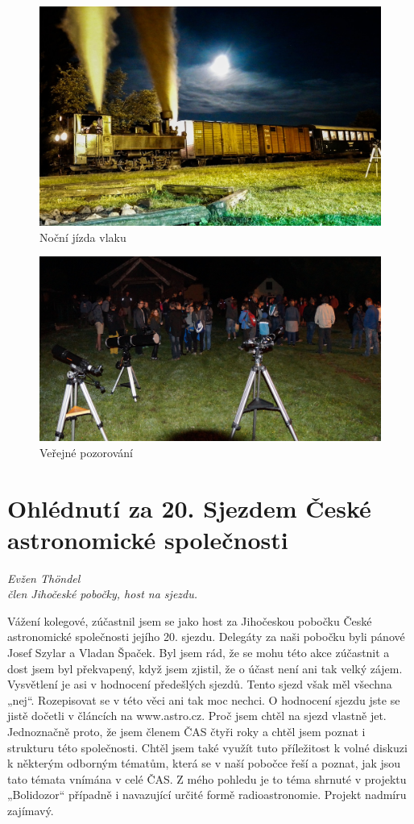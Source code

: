 \documentclass[10pt,a5paper,twoside]{book}
\newcommand{\nadpis}[2]{
\section*{#1}
	\begin{flushright}
	\textit{#2}
	\end{flushright}
}
\begin{document}
\begin{figure}[ht!]
\centering
\includegraphics[width=\textwidth]{media/astrovlak/st.jpg}
\caption{Noční jízda vlaku}
\end{figure}
\vfill
\begin{figure}[ht!]
\centering
\includegraphics[width=\textwidth]{media/astrovlak/pozorovani.jpg}
\caption{Veřejné pozorování}
\end{figure}
\newpage
\nadpis{Ohlédnutí za 20. Sjezdem České astronomické společnosti}{Evžen Thöndel \\ člen Jihočeské pobočky, host na sjezdu.}

Vážení kolegové,
zúčastnil jsem se jako host za Jihočeskou pobočku České astronomické společnosti jejího 20. sjezdu. Delegáty za naši pobočku byli pánové Josef Szylar a Vladan Špaček. Byl jsem rád, že se mohu této akce zúčastnit a dost jsem byl překvapený, když jsem zjistil, že o účast není ani tak velký zájem. Vysvětlení je asi v hodnocení předešlých sjezdů. Tento sjezd však měl všechna „nej“. Rozepisovat se v této věci ani tak moc nechci. O hodnocení sjezdu jste se jistě dočetli v článcích na www.astro.cz. Proč jsem chtěl na sjezd vlastně jet. Jednoznačně proto, že jsem členem ČAS čtyři roky a chtěl jsem poznat i strukturu této společnosti. Chtěl jsem také využít tuto příležitost k volné diskuzi k některým odborným tématům, která se v naší pobočce řeší a poznat, jak jsou tato témata vnímána v celé ČAS. Z mého pohledu je to téma shrnuté v projektu „Bolidozor“ případně i navazující určité formě radioastronomie. Projekt nadmíru zajímavý.
\end{document}
